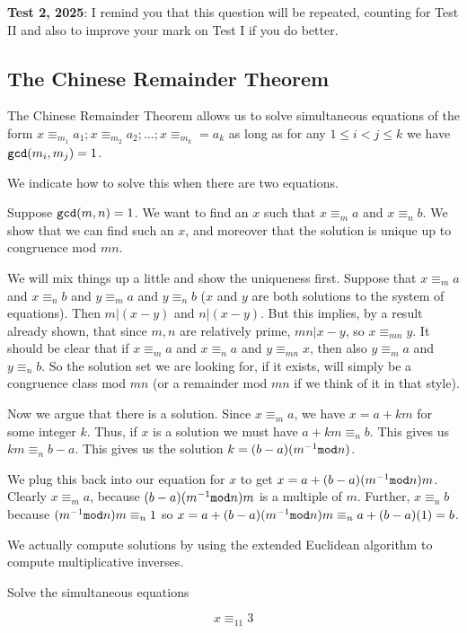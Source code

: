 \documentclass[12pt]{article}
\begin{document}
{\bf Test 2, 2025}:  I remind you that this question will be repeated, counting for Test II and also to improve your mark on Test I if you do better.

\newpage
\subsection{The Chinese Remainder Theorem}

The Chinese Remainder Theorem allows us to solve simultaneous equations of the form $x \equiv_{m_1} a_1; x \equiv_{m_2} a_2;\ldots;x \equiv_{m_k}=a_k$ as long as for any $1 \leq i<j \leq k$ we have ${\tt gcd}(m_i,m_j)=1$.

We indicate how to solve this when there are two equations.

Suppose ${\tt gcd}(m,n)=1$.  We want to find an $x$ such that $x \equiv_m a$ and $x \equiv_n b$.  We show that we can find such an $x$, and moreover that
the solution is unique up to congruence mod $mn$.

We will mix things up a little and show the uniqueness first.  Suppose that $x \equiv_m a$ and $x\equiv_n b$ and $y \equiv_m a$ and $y\equiv_n b$ ($x$ and $y$ are both solutions to the system of equations).  Then $m|(x-y)$ and $n|(x-y)$.  But this implies, by a result already shown, that since $m,n$ are relatively prime, $mn|x-y$, so
$x \equiv_{mn}y$.  It should be clear that if $x \equiv_m a$ and $x \equiv_n a$ and $y \equiv_{mn} x$, then also $y \equiv_m a$ and $y \equiv_n b$.  So the solution set we are looking for, if it exists, will simply be a congruence class mod $mn$ (or a remainder mod $mn$ if we think of it in that style).

Now we argue that there is a solution.  Since $x \equiv_m a$, we have $x=a+km$ for some integer $k$.  Thus, if $x$ is a solution we must
have $a+km \equiv_n b$.  This gives us $km \equiv_n b-a$.  This gives us the solution $k = (b-a)(m^{-1} {\tt mod} n)$.

We plug this back into our equation for $x$ to get $x = a+(b-a)(m^{-1}{\tt mod}n)m$.  Clearly $x \equiv_m a$, because $(b-a)(m^{-1}{\tt mod}n)m$ is a multiple of $m$.
Further, $x \equiv_n b$ because $(m^{-1}{\tt mod}n)m \equiv_n 1$ so $x = a+(b-a)(m^{-1}{\tt mod}n)m \equiv_n a+(b-a)(1) = b$.

We actually compute solutions by using the extended Euclidean algorithm to compute multiplicative inverses.

Solve the simultaneous equations 

$$x \equiv_{11} 3$$
\end{document}
